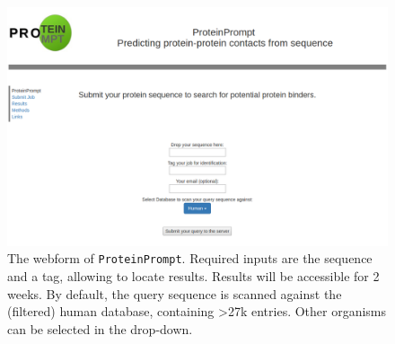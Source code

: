 \documentclass{article}
\newcommand{\tool}{\texttt{ProteinPrompt}}
\begin{document}
\begin{figure}
  \hspace{-1.5cm}\includegraphics[width=1.2\linewidth]{material/webform.png}
  \caption{ The webform of \tool.
    Required inputs are the sequence and a tag, allowing to locate results.
    Results will be accessible for 2 weeks.
    By default, the query sequence is scanned against the (filtered) human database, containing >27k entries.
    Other organisms can be selected in the drop-down.}
\end{figure}






\end{document}

